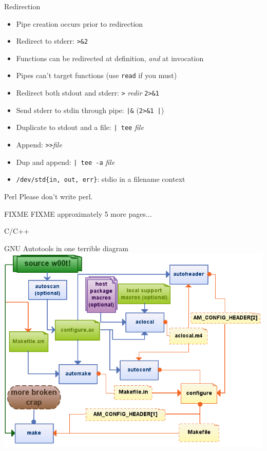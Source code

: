 \documentclass[mathserif,xcolor={dvipsnames,table}]{beamer}
\begin{document}
\begin{frame}{Redirection}
\begin{itemize}
\item Pipe creation occurs prior to redirection
\item Redirect to stderr: \texttt{>\&2}
\item Functions can be redirected at definition, \textit{and} at invocation
\item Pipes can't target functions (use \texttt{read} if you must)
\item Redirect both stdout and stderr: \texttt{>} \textit{redir} \texttt{2>\&1}
\item Send stderr to stdin through pipe: \texttt{|\&} (\texttt{2>\&1 |})
\item Duplicate to stdout and a file: \texttt{| tee} \textit{file}
\item Append: \texttt{>}\texttt{>}\textit{file}
\item Dup and append: \texttt{| tee -a} \textit{file}
\item \texttt{/dev/std\{in, out, err\}}: stdio in a filename context
\end{itemize}
\end{frame}

\begin{frame}{Perl}
Please don't write perl.
\end{frame}

\begin{frame}{FIXME}
\huge FIXME approximately 5 more pages...
\end{frame}

\begin{frame}
\huge{C/C++}
\end{frame}

\begin{frame}{GNU Autotools in one terrible diagram}
\includegraphics[scale=0.45]{images/circleoflife.png}
\end{frame}
\end{document}
